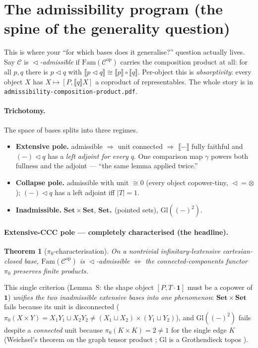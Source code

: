 \documentclass[11pt]{article}
\theoremstyle{plain}
\newtheorem{theorem}{Theorem}
\theoremstyle{definition}
\theoremstyle{remark}
\newcommand{\C}{\mathcal{C}}
\newcommand{\Set}{\mathbf{Set}}
\newcommand{\Fam}{\mathrm{Fam}}
\newcommand{\Gl}{\mathrm{Gl}}
\newcommand{\ext}[1]{\llbracket #1 \rrbracket}
\newcommand{\ihom}[2]{[#1,#2]}
\renewcommand{\lhd}{\vartriangleleft}
\newcommand{\op}{\mathrm{op}}
\newcommand{\pizero}{\pi_0}
\newcommand{\one}{\mathbf{1}}
\begin{document}
\section{The admissibility program (the spine of the generality question)}

This is where your ``for which bases does it generalise?'' question actually lives. Say $\C$ is
\emph{$\lhd$-admissible} if $\Fam(\C^\op)$ carries the composition product at all: for all $p,q$ there
is $p\lhd q$ with $\ext{p\lhd q}\cong\ext p\circ\ext q$. Per-object this is
\emph{absorptivity}: every object $X$ has $X\mapsto\ihom{P}{\ext q X}$ a coproduct of representables.
The whole story is in \texttt{admissibility-composition-product.pdf}.

\paragraph{Trichotomy.} The space of bases splits into three regimes.
\begin{itemize}
\item \textbf{Extensive pole.} admissible $\Rightarrow$ unit connected $\Rightarrow$ $\ext{-}$ fully
faithful and $(-)\lhd q$ has a \emph{left adjoint for every $q$}. One comparison map $\gamma$ powers
both fullness and the adjoint --- ``the same lemma applied twice.''
\item \textbf{Collapse pole.} admissible with unit $\cong 0$ (every object copower-tiny, $\lhd=\otimes$);
$(-)\lhd q$ has a left adjoint iff $|T|=1$.
\item \textbf{Inadmissible.} $\Set\times\Set$, $\Set_*$ (pointed sets), $\Gl((-)^2)$.
\end{itemize}

\paragraph{Extensive-CCC pole --- completely characterised (the headline).}
\begin{theorem}[$\pizero$-characterisation]
On a nontrivial infinitary-lextensive cartesian-closed base, $\Fam(\C^\op)$ is $\lhd$-admissible
$\iff$ the connected-components functor $\pizero$ preserves finite products.
\end{theorem}
\noindent This single criterion (Lemma~S: the shape object $[P,T\cdot\one]$ must be a copower of
$\one$) \emph{unifies the two inadmissible extensive bases into one phenomenon}: $\Set\times\Set$ fails
because its unit is disconnected ($\pizero(X\times Y)=X_1Y_1\sqcup X_2Y_2\neq(X_1\sqcup X_2)\times
(Y_1\sqcup Y_2)$), and $\Gl((-)^2)$ fails despite a \emph{connected} unit because
$\pizero(K\times K)=2\neq 1$ for the single edge $K$ (Weichsel's theorem on the graph tensor product
\cite{Weichsel}; $\Gl$ is a Grothendieck topos \cite{MacLaneMoerdijk,CarboniJohnstone}).
\end{document}
